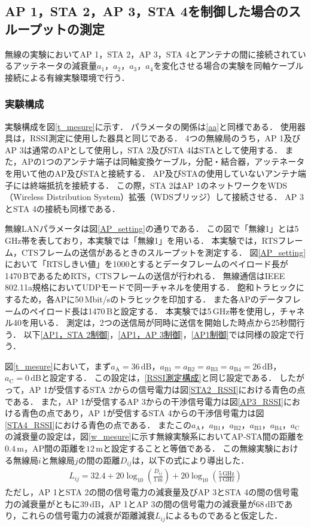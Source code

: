 \documentclass[master]{kuisthesis}		%
\begin{document}
\subsection{AP 1，STA 2，AP 3，STA 4を制御した場合のスループットの測定}\label{全端末制御}
無線の実験においてAP 1，STA 2，AP 3，STA 4とアンテナの間に接続されているアッテネータの減衰量$a_1$，$a_2$，$a_3$，$a_4$を変化させる場合の実験を同軸ケーブル接続による有線実験環境で行う．
\subsubsection{実験構成}\label{全端末制御実験構成}
実験構成を図\ref{t_mesure}に示す．
パラメータの関係は\ref{aa}と同様である．
使用器具は，RSSI測定に使用した器具と同じである．
4つの無線局のうち，AP 1及びAP 3は通常のAPとして使用し，STA 2及びSTA 4はSTAとして使用する．
また，APの1つのアンテナ端子は同軸変換ケーブル，分配・結合器，アッテネータを用いて他のAP及びSTAと接続する．
AP及びSTAの使用していないアンテナ端子には終端抵抗を接続する．
この際，STA 2はAP 1のネットワークをWDS（Wireless Distribution System）拡張（WDSブリッジ）して接続させる．
AP 3とSTA 4の接続も同様である．

無線LANパラメータは図\ref{AP_setting}の通りである．
この図で「無線1」とは5\,GHz帯を表しており，本実験では「無線1」を用いる．
本実験では，RTSフレーム，CTSフレームの送信があるときのスループットを測定する．
図\ref{AP_setting}において「RTSしきい値」を1000とするとデータフレームのペイロード長が1470\,BであるためRTS，CTSフレームの送信が行われる．
無線通信はIEEE 802.11a規格においてUDPモードで同一チャネルを使用する．
飽和トラヒックにするため，各APに50\,Mbit/sのトラヒックを印加する．
また各APのデータフレームのペイロード長は1470\,Bと設定する．
本実験では5\,GHz帯を使用し，チャネル40を用いる．
測定は，2つの送信局が同時に送信を開始した時点から25秒間行う．
以下\ref{AP1，STA 2制御}，\ref{AP1，AP 3制御}，\ref{AP1制御}では同様の設定で行う．

図\ref{t_mesure}において，まず$a_\mathrm{A} = 36\,\mathrm{dB}$，$a_\mathrm{B1} = a_\mathrm{B2} =a_\mathrm{B3} =a_\mathrm{B4} = 26\,\mathrm{dB}$，$a_\mathrm{C} = 0\,\mathrm{dB}$と設定する．
この設定は，\ref{RSSI測定構成}と同じ設定である．
したがって，AP 1が受信するSTA 2からの信号電力は図\ref{STA2_RSSI}における青色の点である．
また，AP 1が受信するAP 3からの干渉信号電力は図\ref{AP3_RSSI}における青色の点であり，AP 1が受信するSTA 4からの干渉信号電力は図\ref{STA4_RSSI}における青色の点である．
またこの$a_\mathrm{A}$，$a_\mathrm{B1}$，$a_\mathrm{B2}$，$a_\mathrm{B3}$，$a_\mathrm{B4}$，$a_\mathrm{C}$の減衰量の設定は，図\ref{w_mesure}に示す無線実験系においてAP-STA間の距離を$0.4\,\mathrm{m}$，AP間の距離を$12\,\mathrm{m}$と設定することと等価である．
この無線実験における無線局$i$と無線局$j$の間の距離$D_{ij}$は，以下の式により導出した．
\begin{align}
L_{ij} = 32.4 + 20\log_{10}\left(\frac{D_{ij}}{1\,\mathrm{m}}\right) + 20\log_{10}\left(\frac{5\,\mathrm{GHz}}{1\,\mathrm{GHz}}\right)
\label{kyori}
\end{align}
ただし，AP 1とSTA 2の間の信号電力の減衰量及びAP 3とSTA 4の間の信号電力の減衰量がともに$39\,\mathrm{dB}$，AP 1とAP 3の間の信号電力の減衰量が$68\,\mathrm{dB}$であり，これらの信号電力の減衰が距離減衰$L_{ij}$によるものであると仮定した．
\end{document}

